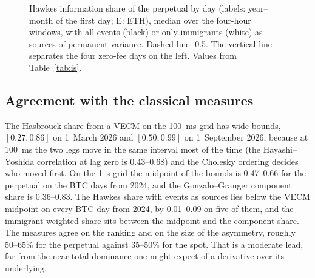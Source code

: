 \documentclass[a4paper,11pt]{article}
\begin{document}
\begin{figure}[htbp]
\centering
{}
\caption{Hawkes information share of the perpetual by day (labels: year--month of the first day; E: ETH), median over the four-hour windows, with all events (black) or only immigrants (white) as sources of permanent variance. Dashed line: 0.5. The vertical line separates the four zero-fee days on the left. Values from Table~\ref{tab:is}.}
\label{fig:is}
\end{figure}

\subsection{Agreement with the classical measures}

The Hasbrouck share from a VECM on the 100~ms grid has wide bounds, $[0.27, 0.86]$ on 1~March 2026 and $[0.50, 0.99]$ on 1~September 2026, because at 100~ms the two legs move in the same interval most of the time (the Hayashi--Yoshida correlation at lag zero is 0.43--0.68) and the Cholesky ordering decides who moved first. On the 1~s grid the midpoint of the bounds is 0.47--0.66 for the perpetual on the BTC days from 2024, and the Gonzalo--Granger component share is 0.36--0.83. The Hawkes share with events as sources lies below the VECM midpoint on every BTC day from 2024, by 0.01--0.09 on five of them, and the immigrant-weighted share sits between the midpoint and the component share. The measures agree on the ranking and on the size of the asymmetry, roughly 50--65\% for the perpetual against 35--50\% for the spot. That is a moderate lead, far from the near-total dominance one might expect of a derivative over its underlying.
\end{document}
